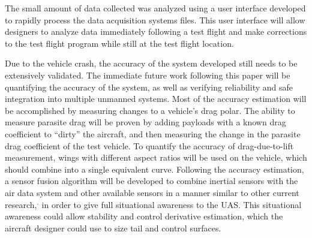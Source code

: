  The small amount of data collected was analyzed using a user interface developed to rapidly process the data acquisition systems files. This user interface will allow designers to analyze data immediately following a test flight and make corrections to the test flight program while still at the test flight location.
 
 Due to the vehicle crash, the accuracy of the system developed still needs to be extensively validated. The immediate future work following this paper will be quantifying the accuracy of the system, as well as verifying reliability and safe integration into multiple unmanned systems. Most of the accuracy estimation will be accomplished by measuring changes to a vehicle's drag polar. The ability to measure parasite drag will be proven by adding payloads with a known drag coefficient to ``dirty'' the aircraft, and then measuring the change in the parasite drag coefficient of the test vehicle. To quantify the accuracy of drag-due-to-lift measurement, wings with different aspect ratios will be used on the vehicle, which should combine into a single equivalent curve\cite{prandtl1923applications}. Following the accuracy estimation, a sensor fusion algorithm will be developed to combine inertial sensors with the air data system and other available sensors in a manner similar to other current research,\cite{wvINSAirData}$^,$\cite{gtUKF} in order to give full situational awareness to the UAS. This situational awareness could allow stability and control derivative estimation, which the aircraft designer could use to size tail and control surfaces.